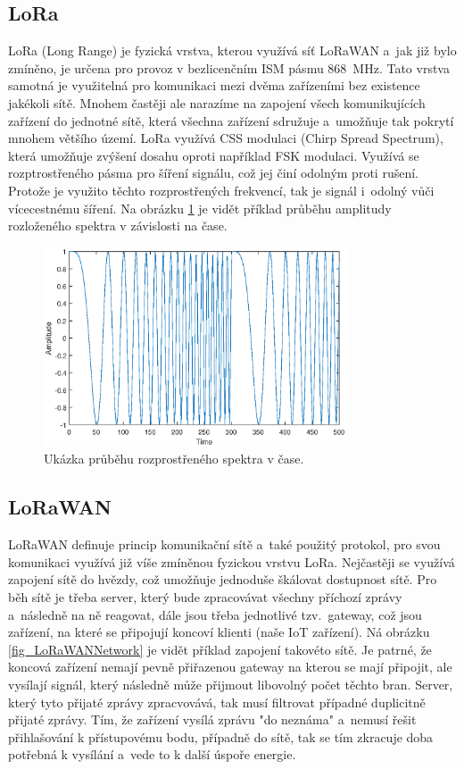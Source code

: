 \subsection{LoRa}

LoRa (Long Range) je fyzická vrstva, kterou využívá síť LoRaWAN a~jak již bylo zmíněno, je určena pro provoz v bezlicenčním ISM pásmu \SI{868}{\mega\hertz}. Tato vrstva samotná je využitelná pro komunikaci mezi dvěma zařízeními bez existence jakékoli sítě. Mnohem častěji ale narazíme na zapojení všech komunikujících zařízení do jednotné sítě, která všechna zařízení sdružuje a~umožňuje tak pokrytí mnohem většího území. LoRa využívá CSS modulaci (Chirp Spread Spectrum), která umožňuje zvýšení dosahu oproti například FSK modulaci. Využívá se rozptrostřeného pásma pro šíření signálu, což jej činí odolným proti rušení. Protože je využito těchto rozprostřených frekvencí, tak je signál i~odolný vůči vícecestnému šíření. Na obrázku \ref{fig_chirpSpreadSpectrum} je vidět příklad průběhu amplitudy rozloženého spektra v závislosti na čase.

\begin{figure}
    \centering
    \includegraphics[width=0.8\textwidth]{obrazky/ChirpSpreadSpectrum.eps}
    \caption{Ukázka průběhu rozprostřeného spektra v čase.}
    \label{fig_chirpSpreadSpectrum}
\end{figure}

\subsection{LoRaWAN}

LoRaWAN definuje princip komunikační sítě a~také použitý protokol, pro svou komunikaci využívá již víše zmíněnou fyzickou vrstvu LoRa. Nejčastěji se využívá zapojení sítě do hvězdy, což umožňuje jednoduše škálovat dostupnost sítě. Pro běh sítě je třeba server, který bude zpracovávat všechny příchozí zprávy a~následně na ně reagovat, dále jsou třeba jednotlivé tzv.~gateway, což jsou zařízení, na které se připojují koncoví klienti (naše IoT zařízení). Ná obrázku \ref{fig_LoRaWANNetwork} je vidět příklad zapojení takovéto sítě. Je patrné, že koncová zařízení nemají pevně přiřazenou gateway na kterou se mají připojit, ale vysílají signál, který následně může přijmout libovolný počet těchto bran. Server, který tyto přijaté zprávy zpracvovává, tak musí filtrovat případné duplicitně přijaté zprávy. Tím, že zařízení vysílá zprávu "do neznáma" a~nemusí řešit přihlašování k přístupovému bodu, případně do sítě, tak se tím zkracuje doba potřebná k vysílání a~vede to k další úspoře energie.

